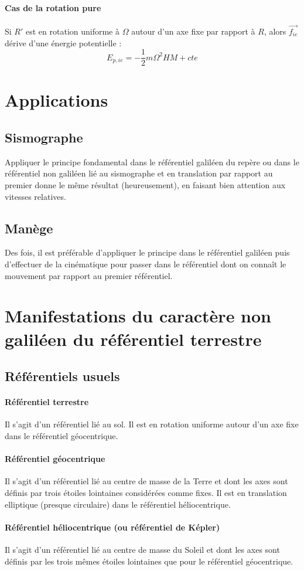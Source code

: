 \documentclass[french]{book}
\theoremstyle{plain}
\theoremstyle{definition}
\theoremstyle{remark}
\begin{document}
\paragraph{Cas de la rotation pure}
Si $R'$ est en rotation uniforme à $\Omega$ autour d'un axe fixe par rapport à $R$, alors $\overrightarrow{f_{ie}}$ dérive d'une énergie potentielle : $$E_{p,ie}=-\frac{1}{2}m\Omega^2HM+cte$$
\section{Applications}
\subsection{Sismographe}
Appliquer le principe fondamental dans le référentiel galiléen du repère ou dans le référentiel non galiléen lié au sismographe et en translation par rapport au premier donne le même résultat (heureusement), en faisant bien attention aux vitesses relatives.
\subsection{Manège}
Des fois, il est préférable d'appliquer le principe dans le référentiel galiléen puis d'effectuer de la cinématique pour passer dans le référentiel dont on connaît le mouvement par rapport au premier référentiel.
\section{Manifestations du caractère non galiléen du référentiel terrestre}
\subsection{Référentiels usuels}
\paragraph{Référentiel terrestre} Il s'agit d'un référentiel lié au sol. Il est en rotation uniforme autour d'un axe fixe dans le référentiel géocentrique.
\paragraph{Référentiel géocentrique} Il s'agit d'un référentiel lié au centre de masse de la Terre et dont les axes sont définis par trois étoiles lointaines considérées comme fixes. Il est en translation elliptique (presque circulaire) dans le référentiel héliocentrique.
\paragraph{Référentiel héliocentrique (ou référentiel de Képler)} Il s'agit d'un référentiel lié au centre de masse du Soleil et dont les axes sont définis par les trois mêmes étoiles lointaines que pour le référentiel géocentrique.
\end{document}

